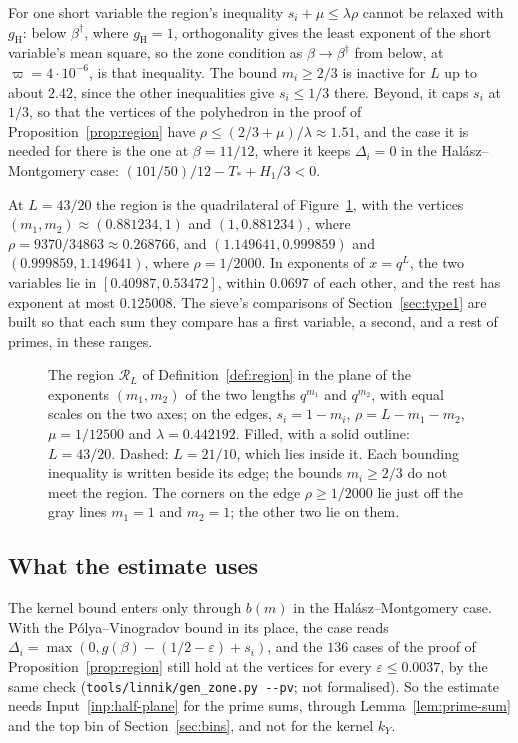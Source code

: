 \documentclass[11pt]{article}
\theoremstyle{definition}
\newcommand{\file}[1]{\nolinkurl{#1}}
\begin{document}
For one short variable the region's inequality $s_i + \mu \le \lambda\rho$ cannot be relaxed with $g_{\mathrm H}$:
below $\beta^\dagger$, where $g_{\mathrm H} = 1$, orthogonality gives the least exponent of the short variable's mean
square, so the zone condition as $\beta \to \beta^\dagger$ from below, at $\varpi = 4 \cdot 10^{-6}$, is that
inequality.
The bound $m_i \ge 2/3$ is inactive for $L$ up to about $2.42$, since the other inequalities give $s_i \le 1/3$ there.
Beyond, it caps $s_i$ at $1/3$, so that the vertices of the polyhedron in the proof of Proposition~\ref{prop:region}
have $\rho \le (2/3 + \mu)/\lambda \approx 1.51$, and the case it is needed for there is the one at $\beta = 11/12$,
where it keeps $\Delta_i = 0$ in the
Hal\'asz--Montgomery case: $(101/50)/12 - T_* + H_1/3 < 0$.

At $L = 43/20$ the region is the quadrilateral of Figure~\ref{fig:region}, with the vertices $(m_1, m_2) \approx
(0.881234, 1)$ and $(1, 0.881234)$, where $\rho = 9370/34863 \approx 0.268766$, and $(1.149641, 0.999859)$ and
$(0.999859, 1.149641)$, where
$\rho = 1/2000$. In exponents of $x = q^L$, the two variables lie in $[0.40987, 0.53472]$, within $0.0697$ of each
other, and the rest has exponent at most $0.125008$. The sieve's comparisons of Section~\ref{sec:type1} are built so
that each sum they compare has a first variable, a second, and a rest of primes, in these ranges.

\begin{figure}[t]
\centering

\caption{The region $\mathcal R_L$ of Definition~\ref{def:region} in the plane of the exponents $(m_1, m_2)$ of the
two lengths $q^{m_1}$ and $q^{m_2}$, with equal scales on the two axes; on the edges, $s_i = 1 - m_i$,
$\rho = L - m_1 - m_2$, $\mu = 1/12500$ and $\lambda = 0.442192$. Filled, with a solid outline: $L = 43/20$. Dashed:
$L = 21/10$, which
lies inside it. Each bounding inequality is written beside its edge; the bounds $m_i \ge 2/3$ do not meet the region.
The corners on the edge $\rho \ge 1/2000$ lie just off the gray lines $m_1 = 1$ and $m_2 = 1$; the other two lie on
them.}
\label{fig:region}
\end{figure}

\subsection*{What the estimate uses}

The kernel bound enters only through $b(m)$ in the Hal\'asz--Montgomery case. With the Pólya--Vinogradov bound in
its place, the case reads $\Delta_i = \max(0, g(\beta) - (1/2 - \varepsilon) + s_i)$, and the $136$ cases of the proof
of
Proposition~\ref{prop:region} still hold at the vertices for every $\varepsilon \le 0.0037$, by the same check
(\file{tools/linnik/gen\_zone.py --pv}; not formalised). So the estimate needs
Input~\ref{inp:half-plane} for the prime sums, through Lemma~\ref{lem:prime-sum} and the top bin of
Section~\ref{sec:bins}, and not for the kernel $k_Y$.
\end{document}
